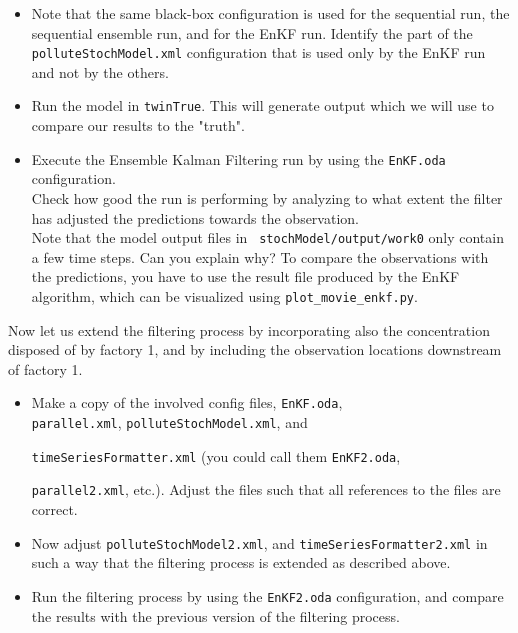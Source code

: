 \begin{itemize}
 \item Note that the same black-box configuration is used for the sequential
   run, the sequential ensemble run, and for the EnKF run. Identify the part of
   the {\tt polluteStochModel.xml} configuration that is used only by the EnKF
   run and not by the others.
 \item Run the model in {\tt twinTrue}. This will generate output which we will use to compare our results to the "truth".
 \item Execute the Ensemble Kalman Filtering run by using the {\tt EnKF.oda}
   configuration.\\ Check how good the run is performing by analyzing to what
   extent the filter has adjusted the predictions towards the
   observation.\\ Note that the model output files in {\tt
     stochModel/output/work0} only contain a few time steps. Can you explain
   why? To compare the observations with the predictions, you have to use
   the result file produced by the EnKF algorithm, which can be visualized using
   {\tt plot\_movie\_enkf.py}.
\end{itemize}

Now let us extend the filtering process by incorporating also the concentration
disposed of by factory 1, and by including the observation locations downstream of
factory 1.

\begin{itemize}
	\item Make a copy of the involved config files, {\tt EnKF.oda},\\ 
		{\tt parallel.xml}, {\tt polluteStochModel.xml}, and


		{\tt timeSeriesFormatter.xml} (you could call them
                {\tt EnKF2.oda}, 

                {\tt parallel2.xml}, etc.). Adjust the files such that all references to the files are correct.
	\item Now adjust {\tt polluteStochModel2.xml}, and {\tt timeSeriesFormatter2.xml}
	      in such a way that the filtering process is extended as described above.
 \item Run the filtering process by using the {\tt EnKF2.oda} configuration,
   and compare the results with the previous version of the filtering process.
\end{itemize}

